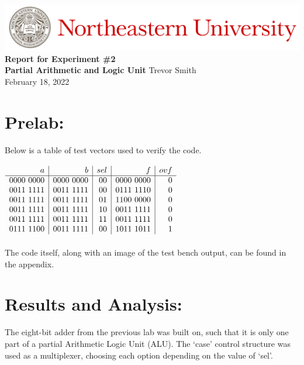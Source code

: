 \documentclass[12pt,a4paper]{article}
\begin{document}
\begin{center}
    \includegraphics[width=\textwidth]{./Images/Header.jpeg}
    \vfill
    \textbf{\Large{Report for Experiment \#2\\
    Partial Arithmetic and Logic Unit}}
    \vfill
    Trevor Smith\\
    February 18, 2022
    \vfill
\end{center}

\newpage

\section*{Prelab:}

Below is a table of test vectors used to verify the code.

$\begin{array}[t]{r|r|r|r|r}
	a & b & sel & f & ovf \\ \hline
	0000\ 0000 & 0000\ 0000 & 00 & 0000\ 0000 & 0 \\
	0011\ 1111 & 0011\ 1111 & 00 & 0111\ 1110 & 0 \\
	0011\ 1111 & 0011\ 1111 & 01 & 1100\ 0000 & 0 \\
	0011\ 1111 & 0011\ 1111 & 10 & 0011\ 1111 & 0 \\
	0011\ 1111 & 0011\ 1111 & 11 & 0011\ 1111 & 0 \\
	0111\ 1100 & 0011\ 1111 & 00 & 1011\ 1011 & 1 \\
\end{array}$ \\ \\

The code itself, along with an image of the test bench output,
can be found in the appendix.

\section*{Results and Analysis:}

The eight-bit adder from the previous lab was built on, such that
it is only one part of a partial Arithmetic Logic Unit (ALU). The
`case' control structure was used as a multiplexer, choosing each
option depending on the value of `sel'. \\
\end{document}
